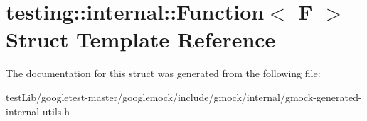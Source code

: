 \hypertarget{structtesting_1_1internal_1_1Function}{}\section{testing\+:\+:internal\+:\+:Function$<$ F $>$ Struct Template Reference}
\label{structtesting_1_1internal_1_1Function}


The documentation for this struct was generated from the following file\+:\begin{DoxyCompactItemize}
\item 
test\+Lib/googletest-\/master/googlemock/include/gmock/internal/gmock-\/generated-\/internal-\/utils.\+h\end{DoxyCompactItemize}

